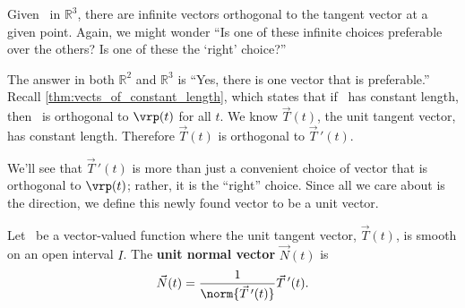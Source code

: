 
Given \vrt\ in $\mathbb{R}^3$,  there are infinite vectors orthogonal to the tangent vector at a given point. Again, we might wonder ``Is one of these infinite choices preferable over the others? Is one of these the `right' choice?''

The answer in both $\mathbb{R}^2$ and $\mathbb{R}^3$ is ``Yes, there is one vector that is preferable.'' %
Recall \autoref{thm:vects_of_constant_length}, which states that if \vrt\ has constant length, then \vrt\ is orthogonal to $\vrp(t)$ for all $t$. We know $\vec T(t)$, the unit tangent vector, has constant length. Therefore $\vec T(t)$ is orthogonal to $\vec T\,'(t)$.

We'll see that $\vec T\,'(t)$ is more than just a convenient choice of vector that is orthogonal to $\vrp(t)$; rather, it is the ``right'' choice. Since all we care about is the direction, we define this newly found vector to be a unit vector.

\begin{definition}\label{def:unit_normal}
Let \vrt\ be a vector-valued function where the unit tangent vector, $\vec T(t)$, is smooth on an open interval $I$. The \textbf{unit normal vector} $\vec N(t)$ is
\[\vec N(t) = \frac1{\norm{\vec T\,'(t)}}\vec T\,'(t).\]
\end{definition}

